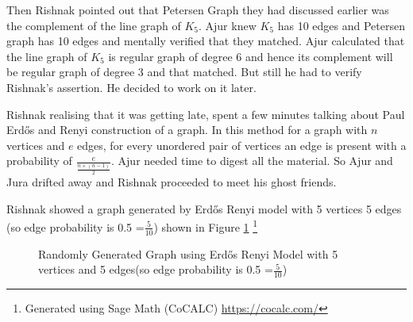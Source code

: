 Then Rishnak pointed out that Petersen Graph they had discussed earlier was the complement of the line graph of $K_5$. Ajur knew $K_5$ has 10 edges and Petersen graph has 10 edges and mentally verified that they matched. Ajur calculated that the line graph of $K_5$ is regular graph of degree 6 and hence its complement will be regular graph of degree 3 and that matched. But still he had to verify Rishnak's assertion. He decided to work on it later.

Rishnak realising that it was getting late, spent a few minutes talking about Paul Erd\H{o}s and Renyi construction of a graph. In this method for a graph with $n$ vertices and $e$ edges, for every unordered pair of vertices  an edge is present with a probability of $\frac{e}{\frac{n \times (n-1)}{2}}$. Ajur needed time to digest all the material. So Ajur and Jura drifted away and Rishnak proceeded to meet his ghost friends.

Rishnak showed a graph generated by Erd\H{o}s Renyi model with 5 vertices 5 edges (so edge probability is 0.5  =$ \frac{5}{10}$) shown in Figure \ref {17g9} \footnote{Generated using Sage Math (CoCALC) \url{https://cocalc.com/}}
\begin{figure}
\begin{center}
\caption{ Randomly Generated Graph using Erd\H{o}s Renyi Model with 5 vertices and 5 edges(so edge probability is 0.5  =$ \frac{5}{10}$)  }\label{17g9}
\end{center}
\end{figure}